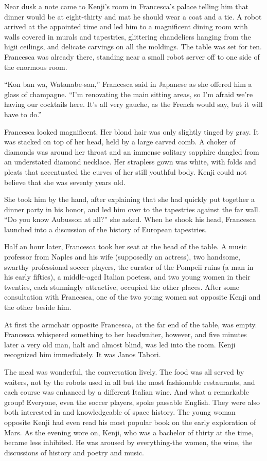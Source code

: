 \documentclass[]{article}
\begin{document}
{Near dusk a note came to Kenji’s room in Francesca’s palace telling him that dinner would be at eight-thirty and mat he should wear a coat and a tie.  A robot arrived at the appointed time and led him to a magnificent dining room with walls covered in murals and tapestries, glittering chandeliers hanging from the higii ceilings, and delicate carvings on all the moldings.  The table was set for ten.  Francesca was already there, standing near a small robot server off to one side of the enormous room.

“Kon ban wa, Watanabe-san,” Francesca said in Japanese as she offered him a glass of champagne.  “I’m renovating the main sitting areas, so I’m afraid we’re having our cocktails here.  It’s all very gauche, as the French would say, but it will have to do.”

Francesca looked magnificent.  Her blond hair was only slightly tinged by gray.  It was stacked on top of her head, held by a large carved comb.  A choker of diamonds was around her throat and an immense solitary sapphire dangled from an understated diamond necklace.  Her strapless gown was white, with folds and pleats that accentuated the curves of her still youthful body.  Kenji could not believe that she was seventy years old.

She took him by the hand, after explaining that she had quickly put together a dinner party in his honor, and led him over to the tapestries against the far wall.  “Do you know Aubusson at all?” she asked.  When he shook his head, Francesca launched into a discussion of the history of European tapestries.

Half an hour later, Francesca took her seat at the head of the table.  A music professor from Naples and his wife (supposedly an actress), two handsome, swarthy professional soccer players, the curator of the Pompeii ruins (a man in his early fifties), a middle-aged Italian poetess, and two young women in their twenties, each stunningly attractive, occupied the other places.  After some consultation with Francesca, one of the two young women sat opposite Kenji and the other beside him.

At first the armchair opposite Francesca, at the far end of the table, was empty.  Francesca whispered something to her headwaiter, however, and five minutes later a very old man, halt and almost blind, was led into the room.  Kenji recognized him immediately.  It was Janos Tabori.

The meal was wonderful, the conversation lively.  The food was all served by waiters, not by the robots used in all but the most fashionable restaurants, and each course was enhanced by a different Italian wine.  And what a remarkable group! Everyone, even the soccer players, spoke passable English.  They were also both interested in and knowledgeable of space history.  The young woman opposite Kenji had even read his most popular book on the early exploration of Mars.  As the evening wore on, Kenji, who was a bachelor of thirty at the time, became less inhibited.  He was aroused by everything-the women, the wine, the discussions of history and poetry and music.

}
\end{document}
